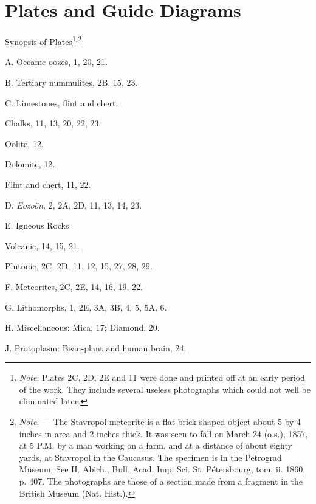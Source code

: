\documentclass[a4paper, 12pt, oneside, landscape]{article}
\begin{document}
\section{Plates and Guide Diagrams}
\centerline{Synopsis of Plates\footnote{\emph{Note}. Plates 2C, 2D, 2E and 11 were done and printed off at an early period of the work. They include several useless photographs which could not well be eliminated later.}$^{,}$\footnote{\emph{Note}. --- The Stavropol meteorite is a flat brick-shaped object about 5 by 4 inches in area and 2 inches thick. It was seen to fall on March 24 (o.s.), 1857, at 5 P.M. by a man working on a farm, and at a distance of about eighty yards, at Stavropol in the Caucasus. The specimen is in the Petrograd Museum. See H. Abich., Bull. Acad. Imp. Sci. St. Pétersbourg, tom. ii. 1860, p. 407. The photographs are those of a section made from a fragment in the British Museum (Nat. Hist.).}}
\bigskip
\begin{description}
    \item A. Oceanic oozes, 1, 20, 21.
    \item B. Tertiary nummulites, 2B, 15, 23.
    \item C. Limestones, flint and chert.
    \item\hspace{15mm}Chalks, 11, 13, 20, 22, 23.
    \item\hspace{15mm}Oolite, 12.
    \item\hspace{15mm}Dolomite, 12.
    \item\hspace{15mm}Flint and chert, 11, 22.
    \item D. \emph{Eozoön}, 2, 2A, 2D, 11, 13, 14, 23.
    \item E. Igneous Rocks
    \item\hspace{15mm}Volcanic, 14, 15, 21.
    \item\hspace{15mm}Plutonic, 2C, 2D, 11, 12, 15, 27, 28, 29.
    \item F. Meteorites, 2C, 2E, 14, 16, 19, 22.
    \item G. Lithomorphs, 1, 2E, 3A, 3B, 4, 5, 5A, 6.
    \item H. Miscellaneous: Mica, 17; Diamond, 20.
    \item J. Protoplasm: Bean-plant and human brain, 24.
\end{description}
\end{document}
